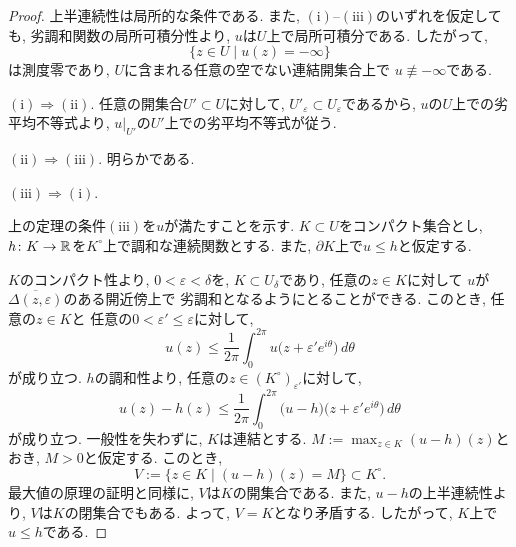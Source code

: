 \begin{proof}
上半連続性は局所的な条件である.
また, $\mathrm{(i)}$--$\mathrm{(iii)}$のいずれを仮定しても,
劣調和関数の局所可積分性より, $u$は$U$上で局所可積分である.
したがって,
\[
\{z \in U \mid u(z)=-\infty\}
\]
は測度零であり,
$U$に含まれる任意の空でない連結開集合上で
$u \not\equiv -\infty$である.

$\mathrm{(i)} \Rightarrow \mathrm{(ii)}$.
任意の開集合$U' \subset U$に対して,
$U'_\varepsilon \subset U_\varepsilon$であるから,
$u$の$U$上での劣平均不等式より,
$u|_{U'}$の$U'$上での劣平均不等式が従う.

$\mathrm{(ii)} \Rightarrow \mathrm{(iii)}$.
明らかである.

$\mathrm{(iii)} \Rightarrow \mathrm{(i)}$.

上の定理の条件$\mathrm{(iii)}$を$u$が満たすことを示す.
$K \subset U$をコンパクト集合とし,
$h \colon K \to \mathbb{R}$を$K^\circ$上で調和な連続関数とする.
また, $\partial K$上で$u \leq h$と仮定する.

$K$のコンパクト性より, $0<\varepsilon<\delta$を,
$K \subset U_\delta$であり, 任意の$z \in K$に対して
$u$が$\overline{\Delta(z,\varepsilon)}$のある開近傍上で
劣調和となるようにとることができる.
このとき, 任意の$z \in K$と
任意の$0<\varepsilon' \leq \varepsilon$に対して,
\[
u(z)
\leq
\frac{1}{2\pi}
\int_0^{2\pi}
u\bigl(z+\varepsilon' e^{i\theta}\bigr)\,d\theta
\]
が成り立つ.
$h$の調和性より, 任意の$z \in (K^\circ)_{\varepsilon'}$に対して,
\[
u(z)-h(z)
\leq
\frac{1}{2\pi}
\int_0^{2\pi}
\bigl(u-h\bigr)\bigl(z+\varepsilon' e^{i\theta}\bigr)\,d\theta
\]
が成り立つ.
一般性を失わずに, $K$は連結とする.
$M:=\max_{z \in K}(u-h)(z)$とおき, $M>0$と仮定する.
このとき,
\[
V:=\{z \in K \mid (u-h)(z)=M\} \subset K^\circ.
\]
最大値の原理の証明と同様に, $V$は$K$の開集合である.
また, $u-h$の上半連続性より, $V$は$K$の閉集合でもある.
よって, $V=K$となり矛盾する.
したがって, $K$上で$u \leq h$である.
\end{proof}


